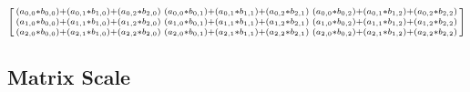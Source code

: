 \documentclass[12pt]{article}
\begin{document}
\begin{center}
$
\begin{bsmallmatrix} 
		         (a_{0, 0} * b_{0, 0}) + (a_{0, 1} * b_{1, 0}) + (a_{0, 2} * b_{2, 0}) & 
                          (a_{0, 0} * b_{0, 1}) + (a_{0, 1} * b_{1, 1}) + (a_{0, 2} * b_{2, 1}) & 
                          (a_{0, 0} * b_{0, 2}) + (a_{0, 1} * b_{1, 2}) + (a_{0, 2} * b_{2, 2}) \\
                          (a_{1, 0} * b_{0, 0}) + (a_{1, 1} * b_{1, 0}) + (a_{1, 2} * b_{2, 0}) & 
                          (a_{1, 0} * b_{0, 1}) + (a_{1, 1} * b_{1, 1}) + (a_{1, 2} * b_{2, 1}) & 
                          (a_{1, 0} * b_{0, 2}) + (a_{1, 1} * b_{1, 2}) + (a_{1, 2} * b_{2, 2}) \\
                          (a_{2, 0} * b_{0, 0}) + (a_{2, 1} * b_{1, 0}) + (a_{2, 2} * b_{2, 0}) & 
                          (a_{2, 0} * b_{0, 1}) + (a_{2, 1} * b_{1, 1}) + (a_{2, 2} * b_{2, 1}) & 
                          (a_{2, 0} * b_{0, 2}) + (a_{2, 1} * b_{1, 2}) + (a_{2, 2} * b_{2, 2}) \\
 \end{bsmallmatrix}
$
\end{center}

\subsection{Matrix Scale}
\end{document}
